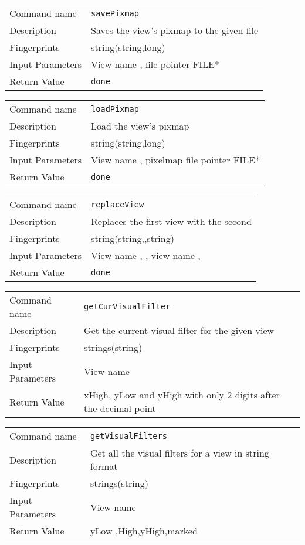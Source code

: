 \noindent
\begin{tabular}{l|p{5in}}
\hline
Command name &{\tt savePixmap }\\ 
Description &
 Saves the view's pixmap to the given file 
 	\\
Fingerprints & string(string,long)\\
Input Parameters& View name , file pointer FILE* \\
Return Value&{\tt done}\\
\hline
\end{tabular}
\bigskip

\noindent
\begin{tabular}{l|p{5in}}
\hline
Command name &{\tt loadPixmap }\\ 
Description &
 Load the view's pixmap 
 	\\
Fingerprints & string(string,long)\\
Input Parameters& View name , pixelmap file pointer FILE* \\
Return Value&{\tt done}\\
\hline
\end{tabular}
\bigskip

\noindent
\begin{tabular}{l|p{5in}}
\hline
Command name &{\tt replaceView }\\ 
Description &
 Replaces the first view with the second 
 	\\
Fingerprints & string(string,,string)\\
Input Parameters& View name , , view name , \\
Return Value&{\tt done}\\
\hline
\end{tabular}
\bigskip

\noindent
\begin{tabular}{l|p{5in}}
\hline
Command name &{\tt getCurVisualFilter }\\ 
Description &
 Get the current visual filter for the given view 
 	\\
Fingerprints & strings(string)\\
Input Parameters& View name \\
Return Value& xHigh, yLow and yHigh with only 2 digits after the decimal point\\
\hline
\end{tabular}
\bigskip

\noindent
\begin{tabular}{l|p{5in}}
\hline
Command name &{\tt getVisualFilters }\\ 
Description &
 Get all the visual filters for a view in string format 
 	\\
Fingerprints & strings(string)\\
Input Parameters& View name \\
Return Value&yLow ,High,yHigh,marked\\
\hline
\end{tabular}
\bigskip

